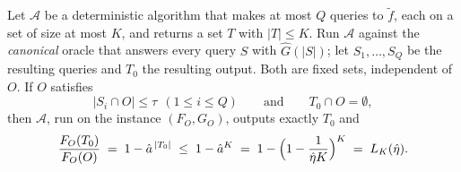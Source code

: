 %
\begin{lemma}\label{lem:n5-val}
Let $\mathcal A$ be a deterministic algorithm that makes at most $Q$ queries to
$\tilde f$, each on a set of size at most $K$, and returns a set $T$ with
$|T|\le K$.  Run $\mathcal A$ against the \emph{canonical} oracle that answers
every query $S$ with $\hat G(|S|)$; let $S_1,\dots,S_Q$ be the resulting queries
and $T_0$ the resulting output.  Both are fixed sets, independent of $O$.  If
$O$ satisfies
\[
  |S_i\cap O|\le\tau\ \ (1\le i\le Q)\qquad\text{and}\qquad T_0\cap O=\emptyset,
\]
then $\mathcal A$, run on the instance $(F_O,G_O)$, outputs exactly $T_0$ and
\[
  \frac{F_O(T_0)}{F_O(O)}\;=\;1-\hat a^{\,|T_0|}\;\le\;1-\hat a^{K}
  \;=\;1-\Bigl(1-\frac{1}{\hat\eta K}\Bigr)^{K}\;=\;L_K(\hat\eta).
\]
\end{lemma}
